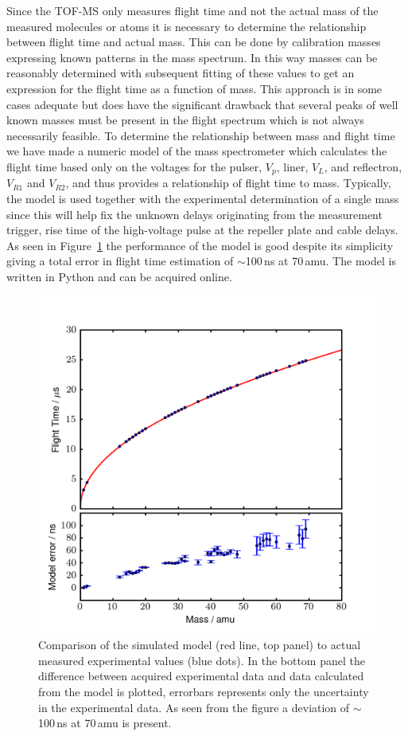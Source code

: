 \documentclass[aip,rsi]{revtex4-1}
\begin{document}
Since the TOF-MS only measures flight time and not the actual mass of the measured molecules or atoms it is necessary to determine the relationship between flight time and actual mass. This can be done by calibration masses expressing known patterns in the mass spectrum. In this way masses can be reasonably determined with subsequent fitting of these values to get an expression for the flight time as a function of mass. This approach is in some cases adequate but does have the significant drawback that several peaks of well known masses must be present in the flight spectrum which is not always necessarily feasible. To determine the relationship between mass and flight time we have made a numeric model of the mass spectrometer which calculates the flight time based only on the voltages for the pulser, $V_p$, liner, $V_L$, and reflectron, $V_{R1}$ and $V_{R2}$, and thus provides a relationship of flight time to mass. Typically, the model is used together with the experimental determination of a single mass since this will help fix the unknown delays originating from the measurement trigger, rise time of the high-voltage pulse at the repeller plate and cable delays. As seen in Figure~\ref{fig:model_error} the performance of the model is good despite its simplicity giving a total error in flight time estimation of $\sim$100\,ns at 70\,amu. The model is written in Python and can be acquired online\cite{ModelGithub}.
\begin{figure}
 \includegraphics[width=14cm]{model_error.png}%
 \caption{Comparison of the simulated model (red line, top panel) to actual measured experimental values (blue dots). In the bottom panel the difference between acquired experimental data and data calculated from the model is plotted, errorbars represents only the uncertainty in the experimental data. As seen from the figure a deviation of $\sim$100\,ns at 70\,amu is present.\label{fig:model_error}}%
\end{figure}
\end{document}
